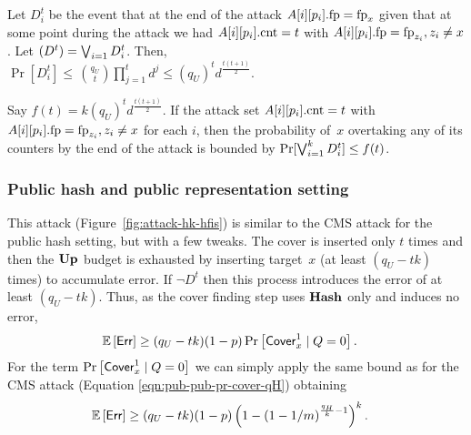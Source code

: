 Let $D_i^t$ be the event that at the end of the attack $A[i][p_i].\textup{fp} = \textup{fp}_x$ given that at some point during the attack we had $A[i][p_i].\textup{cnt} = t$ with $A[i][p_i].\textup{fp} = \textup{fp}_{z_i}, z_i \neq x$. Let $\left(D^t\right)= \bigvee_{i=1} D^t_i$. Then,\\ 
$
	\Pr[D_i^t] {\leq}\, {q_U \choose t}  \prod_{j=1}^{t} d^{j} 
	\leq \left(q_U\right)^t  d^{\frac{t(t+1)}{2}}.
$

Say $f(t) = k  \left(q_U\right)^t  d^{\frac{t(t+1)}{2}}$.
If the attack set $A[i][p_i].\textup{cnt} = t$ with $A[i][p_i].\textup{fp} = \textup{fp}_{z_i}, z_i \neq x$ for each $i$, then the probability of~$x$ overtaking any of its counters by the end of the attack is bounded by 
$\Pr[\bigvee_{i=1}^k D_i^t] \leq f(t)$.

\subsubsection{Public hash and public representation setting}
This attack (Figure~\ref{fig:attack-hk-hfis}) is similar to the CMS attack for the public hash setting, but with a few tweaks. The cover is inserted only $t$ times and then the $\textup{\textbf{Up}}\hspace{0.5pt}$ budget is exhausted by inserting  target~$x$ (at least $(q_U - t k)$ times) to accumulate error. If $\lnot D^t$ then this process introduces the error of at least $(q_U - t k)$.  
Thus, as the cover finding step uses $\textup{\textbf{Hash}}\hspace{0.5pt}$ only and induces no error,
\begin{align*}
	\mathbb{E}&\left[\mathsf{Err}\right]\geq (q_U - t k)  (1-p)  \Pr\left[\mathsf{Cover}^{1}_{x} \mid Q = 0\right].
\end{align*}
For the term $\Pr\left[\mathsf{Cover}^{1}_{x} \mid Q = 0\right]$ we can simply apply the same bound as for the CMS attack (Equation \eqref{eqn:pub-pub-pr-cover-qH}) obtaining
\begin{align*}
	\mathbb{E}&\left[\mathsf{Err}\right]\geq (q_U - t k)  (1-p)  \left(1 - \left(1 - 1/m\right)^{\frac{q_H}{k}-1}\right)^{k}.
\end{align*}

